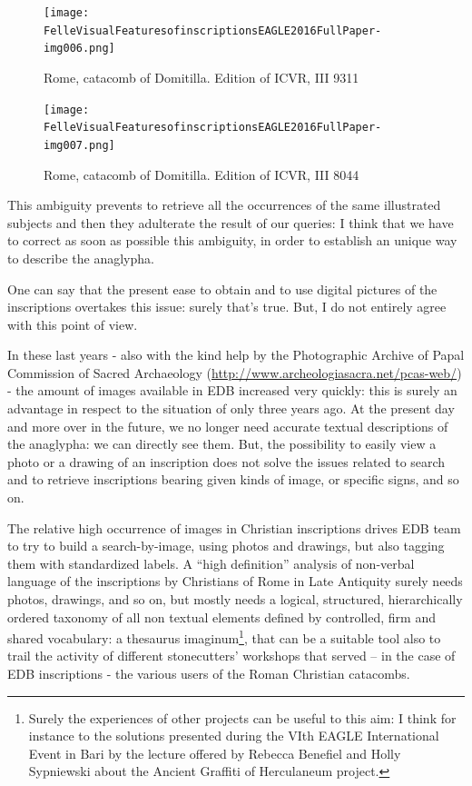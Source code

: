 \documentclass[amsthm,ebook]{saparticle}
\begin{document}
\begin{figure}[!bp]
\centering
 \texttt{[image: FelleVisualFeaturesofinscriptionsEAGLE2016FullPaper-img006.png]}
\caption{Rome, catacomb of Domitilla. Edition of ICVR, III 9311}
\label{fig:5a}
\end{figure}

\begin{figure}[!bp]
\centering
 \texttt{[image: FelleVisualFeaturesofinscriptionsEAGLE2016FullPaper-img007.png]}
\caption{Rome, catacomb of Domitilla. Edition of ICVR, III 8044}
\label{fig:5b}
\end{figure}



This ambiguity prevents to retrieve all the occurrences of the same illustrated subjects and then they adulterate the
result of our queries: I think that we have to correct as soon as possible this ambiguity, in order to establish an
unique way to describe the anaglypha. 

One can say that the present ease to obtain and to use digital pictures of the inscriptions overtakes this issue: surely
that's true. But, I do not entirely agree with this point of view. 

In these last years - also with the kind help by the Photographic Archive of Papal Commission of Sacred Archaeology
(\url{http://www.archeologiasacra.net/pcas-web/}) - the amount of images available in EDB increased very quickly: this is
surely an advantage in respect to the situation of only three years ago. At the present day and more over in the
future, we no longer need accurate textual descriptions of the anaglypha: we can directly see them. But, the
possibility to easily view a photo or a drawing of an inscription does not solve the issues related to search and to
retrieve inscriptions bearing given kinds of image, or specific signs, and so on. 

The relative high occurrence of images in Christian inscriptions drives EDB team to try to build a search-by-image,
using photos and drawings, but also tagging them with standardized labels. A “high definition” analysis of non-verbal
language of the inscriptions by Christians of Rome in Late Antiquity surely needs photos, drawings, and so on, but
mostly needs a logical, structured, hierarchically ordered taxonomy of all non textual elements defined by controlled,
firm and shared vocabulary: a thesaurus imaginum\footnote{ Surely the experiences of other projects can be useful to
this aim: I think for instance to the solutions presented during the VIth EAGLE International Event in Bari by the
lecture offered by Rebecca Benefiel and Holly Sypniewski about the Ancient Graffiti of Herculaneum project.}, that can
be a suitable tool also to trail the activity of different stonecutters’ workshops that served – in the case of EDB
inscriptions - the various users of the Roman Christian catacombs. 
\end{document}
